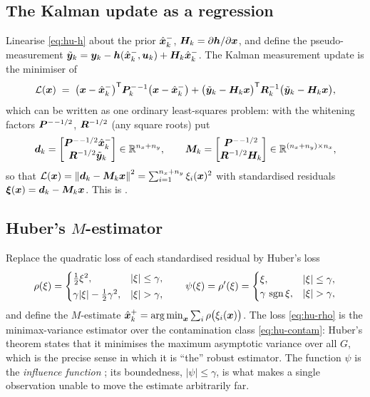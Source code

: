 \subsection{The Kalman update as a regression}
Linearise \eqref{eq:hu-h} about the prior $\hat{\bm{x}}^{-}_k$, $\bm{H}_k=\partial\bm{h}/\partial\bm{x}$, and define
the pseudo-measurement $\tilde{\bm{y}}_k=\bm{y}_k-\bm{h}(\hat{\bm{x}}^{-}_k,\bm{u}_k)+\bm{H}_k\hat{\bm{x}}^{-}_k$.  The Kalman
measurement update is the minimiser of
\begin{equation}
\mathcal{L}(\bm{x}) \;=\;
 \big(\bm{x}-\hat{\bm{x}}^{-}_k\big)^{\mathsf{T}}\bm{P}^{-}_k{}^{-1}\big(\bm{x}-\hat{\bm{x}}^{-}_k\big)
 + \big(\tilde{\bm{y}}_k-\bm{H}_k\bm{x}\big)^{\mathsf{T}}\bm{R}_k^{-1}\big(\tilde{\bm{y}}_k-\bm{H}_k\bm{x}\big),
\label{eq:hu-L}
\end{equation}
which can be written as one ordinary least-squares problem: with the whitening factors
$\bm{P}^{-}{}^{-1/2}$, $\bm{R}^{-1/2}$ (any square roots) put
\begin{equation}
\bm{d}_k = \begin{bmatrix}\bm{P}^{-}{}^{-1/2}\hat{\bm{x}}^{-}_k\\ \bm{R}^{-1/2}\tilde{\bm{y}}_k\end{bmatrix}
\in\mathbb{R}^{n_x+n_y},
\qquad
\bm{M}_k = \begin{bmatrix}\bm{P}^{-}{}^{-1/2}\\ \bm{R}^{-1/2}\bm{H}_k\end{bmatrix}
\in\mathbb{R}^{(n_x+n_y)\times n_x},
\label{eq:hu-stack}
\end{equation}
so that $\mathcal{L}(\bm{x})=\left\lVert \bm{d}_k-\bm{M}_k\bm{x} \right\rVert^2 = \sum_{i=1}^{n_x+n_y}\xi_i(\bm{x})^2$ with
standardised residuals $\bm{\xi}(\bm{x})=\bm{d}_k-\bm{M}_k\bm{x}$.  This is
\cite[Eq.~(9)]{karlgaard2007huber}.

\subsection{Huber's $M$-estimator}
Replace the quadratic loss of each standardised residual by Huber's loss
\begin{equation}
\rho(\xi)=\begin{cases}
 \tfrac12\xi^2, & |\xi|\le\gamma,\\[2pt]
 \gamma|\xi|-\tfrac12\gamma^2, & |\xi|>\gamma,
\end{cases}
\qquad
\psi(\xi)=\rho'(\xi)=\begin{cases}\xi,&|\xi|\le\gamma,\\ \gamma\,\sgn\xi,&|\xi|>\gamma,\end{cases}
\label{eq:hu-rho}
\end{equation}
and define the $M$-estimate
$\hat{\bm{x}}^{+}_k=\operatorname*{arg\,min}_{\bm{x}}\sum_i\rho\big(\xi_i(\bm{x})\big)$.  The loss \eqref{eq:hu-rho} is the
minimax-variance estimator over the contamination class \eqref{eq:hu-contam}: Huber's theorem
\cite{huber1964} states that it minimises the maximum asymptotic variance over all
$G$, which is the precise sense in which it is ``the'' robust estimator.  The function $\psi$ is
the \emph{influence function} \cite{hampel1974influence}; its boundedness,
$|\psi|\le\gamma$, is what makes a single observation unable to move the estimate arbitrarily far.

